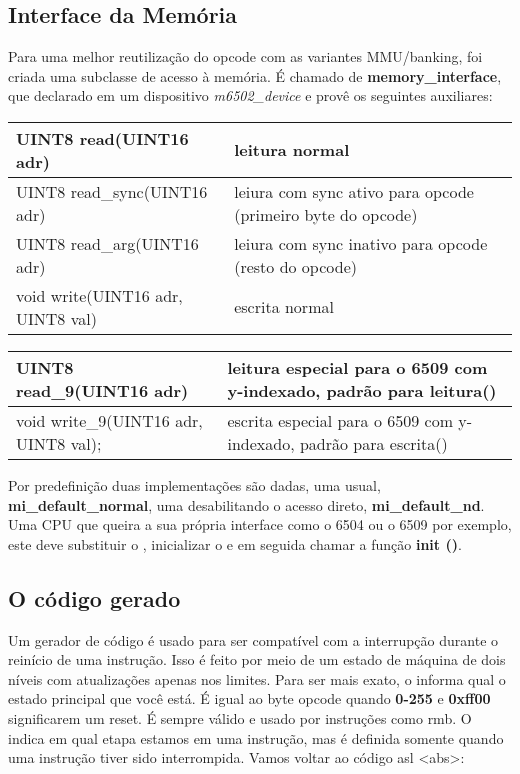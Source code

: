 \documentclass[letterpaper,10pt,brazil]{sphinxmanual}
\begin{document}
\subsection{Interface da Memória}
\label{techspecs/m6502:interface-da-memoria}
Para uma melhor reutilização do opcode com as variantes MMU/banking, foi
criada uma subclasse de acesso à memória.
É chamado de \textbf{memory\_interface}, que declarado em um dispositivo
\emph{m6502\_device} e provê os seguintes auxiliares:

\noindent\begin{tabulary}{\linewidth}{|L|L|}
\hline

UINT8 read(UINT16 adr)
&
leitura normal
\\
\hline
UINT8 read\_sync(UINT16 adr)
&
leiura com sync ativo para opcode (primeiro byte do opcode)
\\
\hline
UINT8 read\_arg(UINT16 adr)
&
leiura com sync inativo para opcode (resto do opcode)
\\
\hline
void write(UINT16 adr, UINT8 val)
&
escrita normal
\\
\hline\end{tabulary}


\noindent\begin{tabulary}{\linewidth}{|L|L|}
\hline

UINT8 read\_9(UINT16 adr)
&
leitura especial para o 6509 com y-indexado, padrão para leitura()
\\
\hline
void write\_9(UINT16 adr, UINT8 val);
&
escrita especial para o 6509 com y-indexado, padrão para escrita()
\\
\hline\end{tabulary}


Por predefinição duas implementações são dadas, uma usual,
\textbf{mi\_default\_normal}, uma desabilitando o acesso direto,
\textbf{mi\_default\_nd}. Uma CPU que queira a sua própria interface como o
6504 ou o 6509 por exemplo, este deve substituir o  ,
inicializar o  e em seguida chamar a função \textbf{init ()}.


\subsection{O código gerado}
\label{techspecs/m6502:o-codigo-gerado}
Um gerador de código é usado para ser compatível com a interrupção
durante o reinício de uma instrução. Isso é feito por meio de um estado
de máquina de dois níveis com atualizações apenas nos limites. Para ser
mais exato, o  informa qual o estado principal que você
está. É igual ao byte opcode quando \textbf{0-255} e \textbf{0xff00} significarem
um reset. É sempre válido e usado por instruções como rmb.
O  indica em qual etapa estamos em uma instrução, mas é
definida somente quando uma instrução tiver sido interrompida.
Vamos voltar ao código asl \textless{}abs\textgreater{}:
\end{document}
